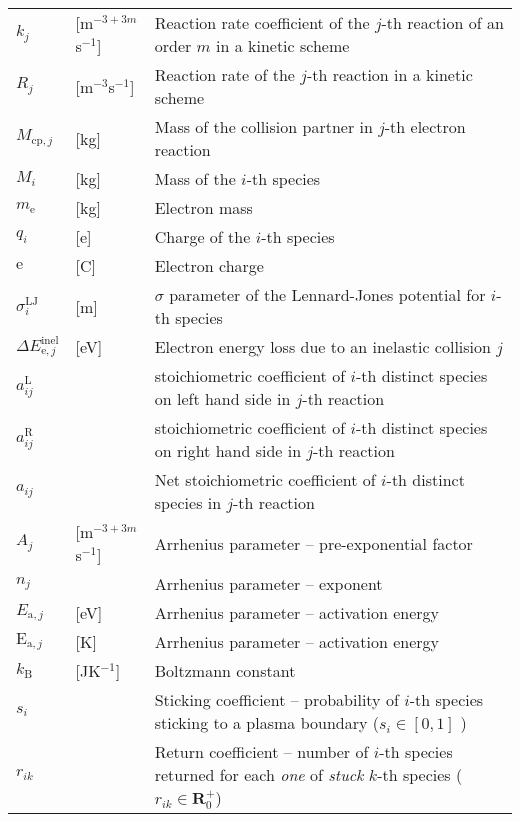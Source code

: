 \begin{longtable}[H]{L{16mm}R{25mm}L{94mm}}
    $k_{j}$ & [m$^{-3 + 3m}$s$^{-1}$] & Reaction rate coefficient of the $j$-th reaction of an order $m$ in a kinetic
                                        scheme \\
    $R_{j}$ & [m$^{-3}$s$^{-1}$] & Reaction rate of the $j$-th reaction in a kinetic scheme \\
    $M_{\mathrm{cp}, j}$ & [kg] & Mass of the collision partner in $j$-th electron reaction \\
    $M_{i}$ & [kg] & Mass of the $i$-th species \\
    $m_{\mathrm{e}}$ & [kg] & Electron mass \\
    $q_{i}$ & [e] & Charge of the $i$-th species \\
    $\mathrm{e}$ & [C] & Electron charge \\
    $\sigma^{\mathrm{LJ}}_{i}$ & [m] & $\sigma$ parameter of the Lennard-Jones potential for $i$-th species \\
    $\Delta E_{\mathrm{e}, j}^{\mathrm{inel}}$ & [eV] & Electron energy loss due to an inelastic collision $j$ \\
    $a_{ij}^{\mathrm{L}}$ & & stoichiometric coefficient of $i$-th distinct species on left hand side in
                              $j$-th reaction \\
    $a_{ij}^{\mathrm{R}}$ & & stoichiometric coefficient of $i$-th distinct species on right hand side in
                              $j$-th reaction \\
    $a_{ij}$ & & Net stoichiometric coefficient of $i$-th distinct species in $j$-th reaction \\
    $A_{j}$ & [m$^{-3 + 3m}$s$^{-1}$] & Arrhenius parameter -- pre-exponential factor \\
    $n_{j}$ & & Arrhenius parameter -- exponent \\
    $E_{\mathrm{a}, j}$ & [eV] & Arrhenius parameter -- activation energy \\
    $\mathrm{E}_{\mathrm{a}, j}$ & [K] & Arrhenius parameter -- activation energy \\
    $k_{\mathrm{B}}$ & [JK$^{-1}$] & Boltzmann constant \\
    $s_{i}$ & & Sticking coefficient -- probability of $i$-th species sticking to a plasma boundary ($s_{i} \in
                [0, 1]$ ) \\
    $r_{ik}$ & & Return coefficient -- number of $i$-th species returned for each \emph{one} of \emph{stuck} $k$-th
                 species ($r_{ik} \in \mathbf{R}^{+}_{0}$) \\

\end{longtable}
